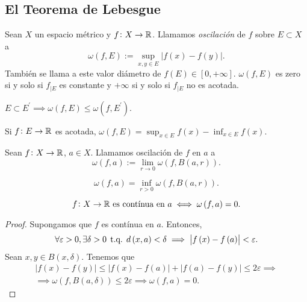 \subsection{El Teorema de Lebesgue}
\begin{defi}
    Sean $X$ un espacio métrico y $f\colon X \to \mathbb{R}$. Llamamos 
    \textit{oscilación} de $f$ sobre $E \subset X$ a
    \[
        \omega\left( f, E \right) := \sup_{x, y \in E} \left| f\left( x\right) - 
        f\left( y\right)\right|.
    \]
    También se llama a este valor diámetro de $f\left( E\right) \in \left[ 
    0, +\infty \right]$. $\omega\left( f, E \right)$ es zero si y solo si $f_{|E}$ es 
    constante y $+\infty$ si y solo si $f_{|E}$ no es acotada.
\end{defi}
\begin{obs}
	$E \subset E^{\prime} \implies \omega\left( f, E\right) \leq \omega\left( f, E^{
	\prime}\right)$.
\end{obs}
\begin{lema}
    Si $f\colon E \to \mathbb{R}$ es acotada, $\omega \left( f, E \right)= \sup_{x\in E}
    f\left( x\right) - \inf_{x\in E} f\left( x\right)$.
\end{lema}
\begin{defi}
    Sean $f\colon X \to \mathbb{R}$, $a\in X$. Llamamos oscilación de $f$ en $a$ a
    \[
        \omega\left( f, a\right) := \lim_{r\to 0} \omega\left( f, B\left( a, r 
        \right) \right).
    \]
\end{defi}
\begin{obs*}
    \[
        \omega\left( f, a\right) = \inf_{r>0} \omega\left( f, B\left( 
        a, r\right) \right).
    \]
\end{obs*}
\begin{lema}
    \[
        f\colon X \to \mathbb{R} \text{  es contínua en $a$} \iff \omega\left( f, a\right)
        = 0.
    \]
\end{lema}
\begin{proof}
    Supongamos que $f$ es contínua en $a$. Entonces,
    \[
        \forall \varepsilon > 0, \exists \delta > 0 \; \operatorname{\text{t.q.}} \; d\left(x, a \right)
        <\delta \implies \left| f\left(x \right) - f\left( a \right) \right| 
        < \varepsilon.
    \]
    Sean $x, y \in B\left( x, \delta \right)$. Tenemos que
    \[
        \begin{gathered}
            \left| f\left(x \right) - f\left( y \right) \right| \leq
            \left| f\left(x \right) - f\left( a \right) \right| +
            \left| f\left(a \right) - f\left( y \right) \right| \leq 2\varepsilon
            \implies \\
            \implies \omega\left( f, B\left( a, \delta \right) \right) \leq 
            2\varepsilon \implies \omega \left( f, a \right) =0.
        \end{gathered}
    \]
\end{proof}


















